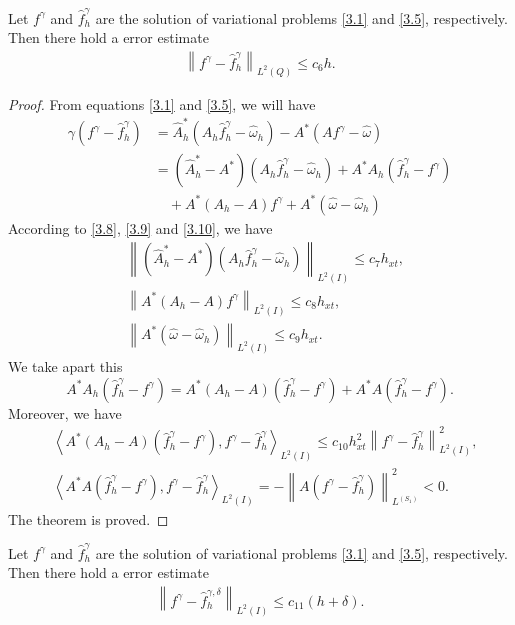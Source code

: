\documentclass[]{article}
\begin{document}
\begin{dl}\label{dl3.3}
	Let $f^\gamma$ and $\hat{f}^\gamma_h$ are the solution of variational problems \eqref{3.1} and \eqref{3.5}, respectively. Then there hold a error estimate
	\begin{align}\label{3.17}
	\left\|f^\gamma-\hat{f}^\gamma_h \right\|_{L^2(Q)}\leq c_6h.
	\end{align}
\end{dl}
\begin{proof} From equations \eqref{3.1} and \eqref{3.5}, we will have
	\begin{align*}
		\gamma \left(f^\gamma-\hat{f}^\gamma_h\right)&=\hat{A}^*_h\left(A_h\hat{f}^\gamma_h-\hat{\omega}_h\right)-A^*\left(Af^\gamma-\hat{\omega}\right)\\
		&=\left(\hat{A}^*_h-A^*\right)\left(A_h\hat{f}^\gamma_h-\hat{\omega}_h\right)+A^*A_h\left(\hat{f}^\gamma_h-f^\gamma\right)\\
		&\quad+A^*\left(A_h-A\right)f^\gamma+A^*\left(\hat{\omega}-\hat{\omega}_h\right)
	\end{align*}
	According to \eqref{3.8}, \eqref{3.9} and \eqref{3.10}, we have
	\begin{align*}
		&\left\| \left(\hat{A}^*_h-A^*\right)\left(A_h\hat{f}^\gamma_h-\hat{\omega}_h\right)\right\|_{L^2(I)}\leq c_7h_{xt},\\
		&\left\| A^*\left(A_h-A\right)f^\gamma\right\|_{L^2(I)}\leq c_8h_{xt},\\
		&\left\|A^*\left(\hat{\omega}-\hat{\omega}_h\right) \right\|_{L^2(I)}\leq c_9h_{xt}.
	\end{align*}
	We take apart this
	$$A^*A_h\left(\hat{f}^\gamma_h-f^\gamma\right)=A^*\left(A_h-A\right)\left(\hat{f}^\gamma_h-f^\gamma\right)+A^*A\left(\hat{f}^\gamma_h-f^\gamma\right).$$
	Moreover, we have
	\begin{align*}
		&\left\langle A^*\left(A_h-A\right)\left(\hat{f}^\gamma_h-f^\gamma\right), f^\gamma-\hat{f}^\gamma_h\right\rangle_{L^2(I)}\leq c_{10}h_{xt}^2\left\| f^\gamma-\hat{f}^\gamma_h\right\|^2_{L^2(I)},\\
		&\left\langle A^*A\left(\hat{f}^\gamma_h-f^\gamma\right), f^\gamma-\hat{f}^\gamma_h\right\rangle_{L^2(I)}=-\left\|A\left(f^\gamma-\hat{f}^\gamma_h\right) \right\|^2_{L^(S_1)}<0.
	\end{align*}
	The theorem is proved.
\end{proof}
\begin{cy}\label{cy3.1}
	Let $f^\gamma$ and $\hat{f}^\gamma_h$ are the solution of variational problems \eqref{3.1} and \eqref{3.5}, respectively. Then there hold a error estimate
	\begin{align}\label{3.12}
		\left\|f^\gamma-\hat{f}^{\gamma, \delta}_h \right\|_{L^2(I)}\leq c_{11}(h+\delta).
	\end{align}
\end{cy}
\end{document}
